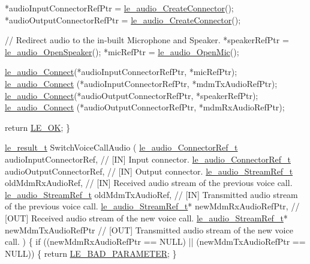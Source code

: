 \begin{DoxyCode}
    *audioInputConnectorRefPtr = \hyperlink{le__audio__interface_8h_a570aaf85086f00aca592acfbaaa237be}{le\_audio\_CreateConnector}();
    *audioOutputConnectorRefPtr = \hyperlink{le__audio__interface_8h_a570aaf85086f00aca592acfbaaa237be}{le\_audio\_CreateConnector}();

    \textcolor{comment}{// Redirect audio to the in-built Microphone and Speaker.}
    *speakerRefPtr = \hyperlink{le__audio__interface_8h_a5c19afce44021c4abf6193707317f8de}{le\_audio\_OpenSpeaker}();
    *micRefPtr = \hyperlink{le__audio__interface_8h_a74f1ef979329f6c2bd56ea622f4d05b2}{le\_audio\_OpenMic}();

    \hyperlink{le__audio__interface_8h_a338df65b2fb1ae0140d86880adbcf0de}{le\_audio\_Connect}(*audioInputConnectorRefPtr, *micRefPtr);
    \hyperlink{le__audio__interface_8h_a338df65b2fb1ae0140d86880adbcf0de}{le\_audio\_Connect} (*audioInputConnectorRefPtr, *mdmTxAudioRefPtr);
    \hyperlink{le__audio__interface_8h_a338df65b2fb1ae0140d86880adbcf0de}{le\_audio\_Connect}(*audioOutputConnectorRefPtr, *speakerRefPtr);
    \hyperlink{le__audio__interface_8h_a338df65b2fb1ae0140d86880adbcf0de}{le\_audio\_Connect} (*audioOutputConnectorRefPtr, *mdmRxAudioRefPtr);

    \textcolor{keywordflow}{return} \hyperlink{le__basics_8h_a1cca095ed6ebab24b57a636382a6c86ca5066a4bcec691c6b67843b8f79656422}{LE\_OK};
\}


\hyperlink{le__basics_8h_a1cca095ed6ebab24b57a636382a6c86c}{le\_result\_t} SwitchVoiceCallAudio
(
    \hyperlink{le__audio__interface_8h_ab819480f4ce3f36e62b6a4e327668304}{le\_audio\_ConnectorRef\_t}  audioInputConnectorRef,  \textcolor{comment}{// [IN] Input connector.}
    \hyperlink{le__audio__interface_8h_ab819480f4ce3f36e62b6a4e327668304}{le\_audio\_ConnectorRef\_t}  audioOutputConnectorRef, \textcolor{comment}{// [IN] Output connector.}
    \hyperlink{le__audio__interface_8h_a9a46ff5a5afa61f1bc76120ab9e4da0a}{le\_audio\_StreamRef\_t}     oldMdmRxAudioRef,        \textcolor{comment}{// [IN] Received audio stream of
       the previous voice call.}
    \hyperlink{le__audio__interface_8h_a9a46ff5a5afa61f1bc76120ab9e4da0a}{le\_audio\_StreamRef\_t}     oldMdmTxAudioRef,        \textcolor{comment}{// [IN] Transmitted audio stream
       of the previous voice call.}
    \hyperlink{le__audio__interface_8h_a9a46ff5a5afa61f1bc76120ab9e4da0a}{le\_audio\_StreamRef\_t}*    newMdmRxAudioRefPtr,     \textcolor{comment}{// [OUT] Received audio stream of
       the new voice call.}
    \hyperlink{le__audio__interface_8h_a9a46ff5a5afa61f1bc76120ab9e4da0a}{le\_audio\_StreamRef\_t}*    newMdmTxAudioRefPtr      \textcolor{comment}{// [OUT] Transmitted audio stream
       of the new voice call.}
)
\{
    \textcolor{keywordflow}{if} ((newMdmRxAudioRefPtr == NULL)     ||
        (newMdmTxAudioRefPtr == NULL))
    \{
        \textcolor{keywordflow}{return} \hyperlink{le__basics_8h_a1cca095ed6ebab24b57a636382a6c86cabe505065132f6e8850da6f476d8fb783}{LE\_BAD\_PARAMETER};
    \}


\end{DoxyCode}
